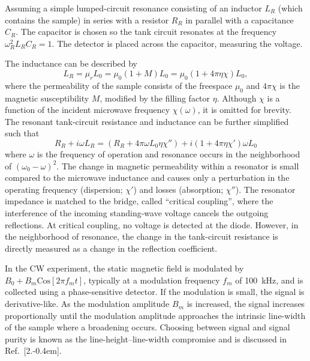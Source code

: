 Assuming a simple lumped-circuit resonance consisting of an inductor $L_R$ (which contains the sample) in series with a resistor $R_R$ in parallel with a capacitance $C_R$. The capacitor is chosen so the tank circuit resonates at the frequency $\omega_R^2 L_R C_R = 1$. The detector is placed across the capacitor, measuring the voltage. 

The inductance can be described by
\begin{equation}
    L_R = \mu_r L_0 = \mu_0 (1 + M)L_0 = \mu_0 (1 + 4 \pi \eta \chi)L_0,
\end{equation}
where the permeability of the sample consists of the freespace $\mu_0$ and $4\pi\chi$ is the magnetic susceptibility $M$, modified by the filling factor $\eta$. \cite{ramo1984fields} Although $\chi$ is a function of the incident microwave frequency $\chi(\omega)$, it is omitted for brevity. The resonant tank-circuit resistance and inductance can be further simplified such that
\begin{equation}
    R_R + i \omega L_R = (R_R + 4\pi \omega L_0 \eta \chi'') + i (1+4\pi\eta\chi')\omega L_0
\end{equation}
where $\omega$ is the frequency of operation and resonance occurs in the neighborhood of $(\omega_0-\omega)^2$. \cite{schumacher1970introduction} The change in magnetic permeability within a resonator is small compared to the microwave inductance and causes only a perturbation in the operating frequency (dispersion; $\chi'$) and losses (absorption; $\chi''$). The resonator impedance is matched to the bridge, called ``critical coupling'', where the interference of the incoming standing-wave voltage cancels the outgoing reflections. At critical coupling, no voltage is detected at the diode. However, in the neighborhood of resonance, the change in the tank-circuit resistance is directly measured as a change in the reflection coefficient. 

In the CW experiment, the static magnetic field is modulated by $B_0 + B_m \text{Cos}[2\pi f_m t]$, typically at a modulation frequency $f_m$ of 100~kHz, and is collected using a phase-sensitive detector. \cite{weil2007electron} If the modulation is small, the signal is derivative-like. \cite{Hyde1990pseudo} As the modulation amplitude $B_m$ is increased, the signal increases proportionally until the modulation amplitude approaches the intrinsic line-width of the sample where a broadening occurs. Choosing between signal and signal purity is known as the line-height--line-width compromise and is discussed in Ref.~[2.\kern-0.4em]. 

